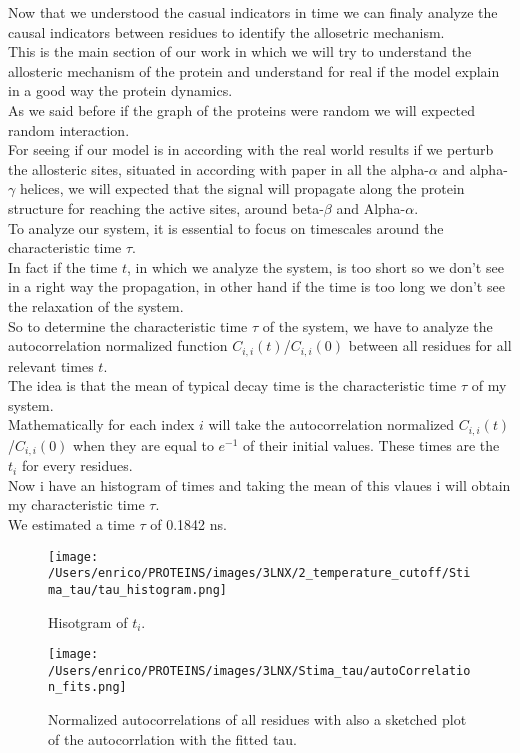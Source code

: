 \documentclass[English, Lau, oneside]{sapthesis}
\begin{document}
\newpage
Now that we understood the casual indicators in time we can finaly analyze the causal indicators between residues to identify the allosetric mechanism.\\
This is the main section of our work in which we will try to understand the allosteric mechanism of the protein and understand for real if the model explain in a good way the protein dynamics.\\
As we said before if the graph of the proteins were random we will expected random interaction.\\ 
For seeing if our model is in according with the real world results if we perturb the allosteric sites, situated in according with paper \cite{ref15} in all the alpha-$\alpha$ and alpha-$\gamma$ helices, we will expected that the signal will propagate along the protein structure for reaching the active sites, around beta-$\beta$ and Alpha-$\alpha$.\\
To analyze our system, it is essential to focus on timescales around the characteristic time \(\tau\). \\
In fact if the time \(t\), in which we analyze the system, is too short so we don't see in a right way the propagation, in other hand if the time is too long we don't see the relaxation of the system.\\
So to determine the characteristic time \(\tau\) of the system, we have to analyze the autocorrelation normalized function \(C_{i,i}(t)\)/\(C_{i,i}(0)\) between all residues for all relevant times \(t\). \\
The idea is that the mean of typical decay time is the characteristic time \(\tau\) of my system.\\
Mathematically for each index \(i\)  will take the autocorrelation normalized \(C_{i,i}(t)\)/\(C_{i,i}(0)\) when they are equal to \(e^{-1}\) of their initial values. These times are the \(t_i\) for every residues.\\
Now i have an histogram  of times and taking the mean of this vlaues i will obtain my characteristic time \(\tau\).\\
We estimated a time \(\tau\) of 0.1842 ns.\\
\begin{figure}[h!]
    \centering
    \texttt{[image: /Users/enrico/PROTEINS/images/3LNX/2\_temperature\_cutoff/Stima\_tau/tau\_histogram.png]}
    \caption{Hisotgram of \(t_i\).}
\end{figure} 
\begin{figure}[h!]
    \centering
    \texttt{[image: /Users/enrico/PROTEINS/images/3LNX/Stima\_tau/autoCorrelation\_fits.png]}
    \caption{Normalized autocorrelations of all residues with also a sketched plot of the autocorrlation with the fitted tau.}
\end{figure}
\end{document}
